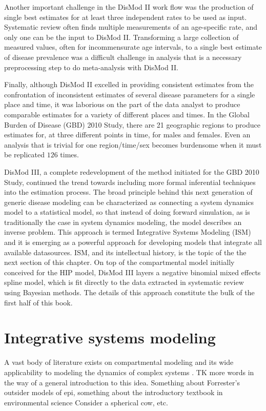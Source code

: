 Another important challenge in the DisMod II work flow was the
production of single best estimates for at least three independent
rates to be used as input.  Systematic review often finds multiple
measurements of an age-specific rate, and only one can be the input to
DisMod II.  Transforming a large collection of measured values, often
for incommensurate age intervals, to a single best estimate of disease
prevalence was a difficult challenge in analysis that is a necessary
preprocessing step to do meta-analysis with DisMod II.

Finally, although DisMod II excelled in providing consistent estimates
from the confrontation of inconsistent estimates of several disease
parameters for a single place and time, it was laborious on the part
of the data analyst to produce comparable estimates for a variety of
different places and times. In the Global Burden of Disease (GBD) 2010
Study, there are 21 geographic regions to produce estimates for, at
three different points in time, for males and females. Even an
analysis that is trivial for one region/time/sex becomes burdensome
when it must be replicated $126$ times.

DisMod III, a complete redevelopment of the method initiated for the
GBD 2010 Study, continued the trend towards including more formal
inferential techniques into the estimation process.  The broad
principle behind this next generation of generic disease modeling can
be characterized as connecting a system dynamics model to a
statistical model, so that instead of doing forward simulation, as is
traditionally the case in system dynamics modeling, the model
describes an inverse problem. This approach is termed Integrative
Systems Modeling (ISM) and it is emerging as a powerful approach for
developing models that integrate all available datasources.  ISM, and
its intellectual history, is the topic of the the next section of this
chapter.  On top of the compartmental model initially conceived for
the HIP model, DisMod III layers a negative binomial mixed effects
spline model, which is fit directly to the data extracted in
systematic review using Bayesian methods.  The details of this
approach constitute the bulk of the first half of this book.

\section{Integrative systems modeling}
\label{intro-ism}
A vast body of literature exists on compartmental modeling and its
wide applicability to modeling the dynamics of complex systems
\cite{Forrester_Principles_1968, Meadows_Thinking_2008,
  Bossel_Systems_2007}.  TK more words in the way of a general
introduction to this idea.  Something about Forrester's outsider
models of epi, something about the introductory textbook in
environmental science Consider a spherical cow, etc.

